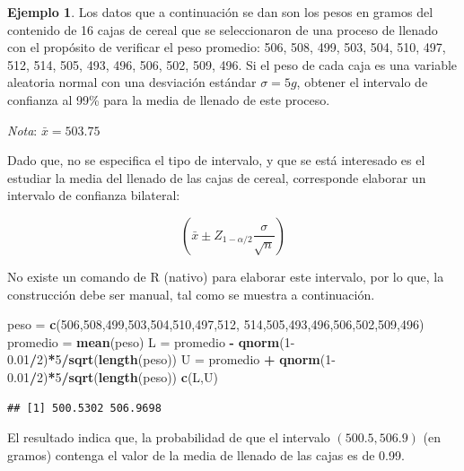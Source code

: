 \documentclass[
  11pt,
]{book}
\newenvironment{Shaded}{\begin{snugshade}}{\end{snugshade}}
\newcommand{\DecValTok}[1]{\textcolor[rgb]{0.00,0.00,0.81}{#1}}
\newcommand{\FloatTok}[1]{\textcolor[rgb]{0.00,0.00,0.81}{#1}}
\newcommand{\FunctionTok}[1]{\textcolor[rgb]{0.13,0.29,0.53}{\textbf{#1}}}
\newcommand{\NormalTok}[1]{#1}
\newcommand{\OtherTok}[1]{\textcolor[rgb]{0.56,0.35,0.01}{#1}}
\newcommand{\SpecialCharTok}[1]{\textcolor[rgb]{0.81,0.36,0.00}{\textbf{#1}}}
\theoremstyle{definition}
\theoremstyle{definition}
\newtheorem{example}{Ejemplo}[chapter]
\theoremstyle{definition}
\theoremstyle{definition}
\theoremstyle{remark}
\begin{document}
\begin{example}
\protect\hypertarget{exm:ejemplo1IC}{}\label{exm:ejemplo1IC}Los datos que a continuación se dan son los pesos en gramos del contenido de 16 cajas de cereal que se seleccionaron de una proceso de llenado con el propósito de verificar el peso promedio: 506, 508, 499, 503, 504, 510, 497, 512, 514, 505, 493, 496, 506, 502, 509, 496. Si el peso de cada caja es una variable aleatoria normal con una desviación estándar \(\sigma = 5g\), obtener el intervalo de confianza al 99\% para la media de llenado de este proceso.

\emph{Nota}: \(\bar{x} = 503.75\)

Dado que, no se especifica el tipo de intervalo, y que se está interesado es el estudiar la media del llenado de las cajas de cereal, corresponde elaborar un intervalo de confianza bilateral:

\[\left(\bar{x} \pm Z_{1-\alpha/2}\displaystyle\frac{\sigma}{\sqrt{n}}\right)\]

No existe un comando de R (nativo) para elaborar este intervalo, por lo que, la construcción debe ser manual, tal como se muestra a continuación.

\begin{Shaded}
\begin{Highlighting}[]
\NormalTok{peso }\OtherTok{=} \FunctionTok{c}\NormalTok{(}\DecValTok{506}\NormalTok{,}\DecValTok{508}\NormalTok{,}\DecValTok{499}\NormalTok{,}\DecValTok{503}\NormalTok{,}\DecValTok{504}\NormalTok{,}\DecValTok{510}\NormalTok{,}\DecValTok{497}\NormalTok{,}\DecValTok{512}\NormalTok{,}
         \DecValTok{514}\NormalTok{,}\DecValTok{505}\NormalTok{,}\DecValTok{493}\NormalTok{,}\DecValTok{496}\NormalTok{,}\DecValTok{506}\NormalTok{,}\DecValTok{502}\NormalTok{,}\DecValTok{509}\NormalTok{,}\DecValTok{496}\NormalTok{)}
\NormalTok{promedio }\OtherTok{=} \FunctionTok{mean}\NormalTok{(peso)}
\NormalTok{L }\OtherTok{=}\NormalTok{ promedio }\SpecialCharTok{{-}} \FunctionTok{qnorm}\NormalTok{(}\DecValTok{1}\FloatTok{{-}0.01}\SpecialCharTok{/}\DecValTok{2}\NormalTok{)}\SpecialCharTok{*}\DecValTok{5}\SpecialCharTok{/}\FunctionTok{sqrt}\NormalTok{(}\FunctionTok{length}\NormalTok{(peso))}
\NormalTok{U }\OtherTok{=}\NormalTok{ promedio }\SpecialCharTok{+} \FunctionTok{qnorm}\NormalTok{(}\DecValTok{1}\FloatTok{{-}0.01}\SpecialCharTok{/}\DecValTok{2}\NormalTok{)}\SpecialCharTok{*}\DecValTok{5}\SpecialCharTok{/}\FunctionTok{sqrt}\NormalTok{(}\FunctionTok{length}\NormalTok{(peso))}
\FunctionTok{c}\NormalTok{(L,U)}
\end{Highlighting}
\end{Shaded}

\begin{verbatim}
## [1] 500.5302 506.9698
\end{verbatim}

El resultado indica que, la probabilidad de que el intervalo \((500.5, 506.9)\) (en gramos) contenga el valor de la media de llenado de las cajas es de 0.99.
\end{example}
\end{document}
